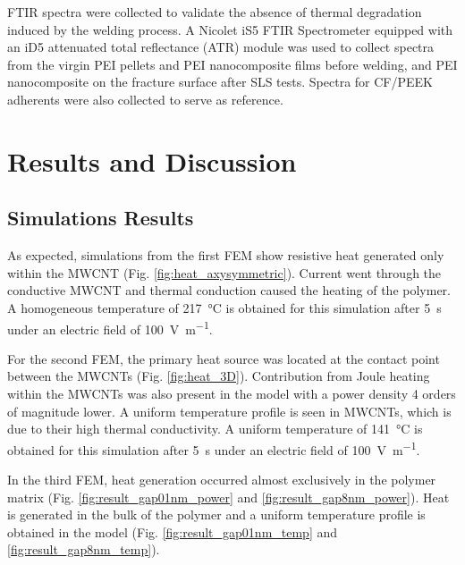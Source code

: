 \documentclass[11pt,review,times]{elsarticle}
\begin{document}
FTIR spectra were collected to validate the absence of thermal degradation induced by the welding process. 
A Nicolet iS5 FTIR Spectrometer equipped with an iD5 attenuated total reflectance (ATR) module was used to collect spectra from the virgin PEI pellets and PEI nanocomposite films before welding, and PEI nanocomposite on the fracture surface after SLS tests. 
Spectra for CF/PEEK adherents were also collected to serve as reference.  

\FloatBarrier
							\section{Results and Discussion}

\subsection{Simulations Results}

As expected, simulations from the first FEM show resistive heat generated only within the MWCNT (Fig. \ref{fig:heat_axysymmetric}). 
Current went through the conductive MWCNT and thermal conduction caused the heating of the polymer. 
A homogeneous temperature of \SI{217}{\celsius} is obtained for this simulation after \SI{5}{\second} under an electric field of \SI{100}{\volt\per\metre}. 

For the second FEM, the primary heat source was located at the contact point between the MWCNTs (Fig. \ref{fig:heat_3D}). 
Contribution from Joule heating within the MWCNTs was also present in the model with a power density 4 orders of magnitude lower. 
A uniform temperature profile is seen in MWCNTs, which is due to their high thermal conductivity. 
A uniform temperature of \SI{141}{\celsius} is obtained for this simulation after \SI{5}{\second} under an electric field of \SI{100}{\volt\per\metre}. 


In the third FEM, heat generation occurred almost exclusively in the polymer matrix (Fig. \ref{fig:result_gap01nm_power} and \ref{fig:result_gap8nm_power}). 
Heat is generated in the bulk of the polymer and a uniform temperature profile is obtained in the model (Fig. \ref{fig:result_gap01nm_temp} and \ref{fig:result_gap8nm_temp}). 

\FloatBarrier
\end{document}
